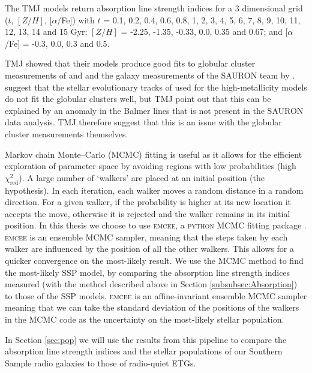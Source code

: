 			The TMJ models return absorption line strength indices for a 3 dimensional grid ($t$, $[Z/H]$, [$\alpha$/Fe]) with $t$ = 0.1, 0.2, 0.4, 0.6, 0.8, 1, 2, 3, 4, 5, 6, 7, 8, 9, 10, 11, 12, 13, 14 and 15 Gyr; $[Z/H]$ = -2.25, -1.35, -0.33, 0.0, 0.35 and 0.67; and [$\alpha$/Fe] = -0.3, 0.0, 0.3 and 0.5.

			TMJ showed that their models produce good fits to globular cluster measurements of \citet{Puzia2002} and \citet{Schiavon2005} and the galaxy measurements of the SAURON team by \citet{Kuntschner2010}. \citet{Conroy2010} suggest that the stellar evolutionary tracks of \citet{Girardi2000} used for the high-metallicity models do not fit the globular clusters well, but TMJ point out that this can be explained by an anomaly in the Balmer lines that is not present in the SAURON data analysis. TMJ therefore suggest that this is an issue with the globular cluster measurements themselves. 


			Markov chain Monte--Carlo (MCMC) fitting is useful as it allows for the efficient exploration of parameter space by avoiding regions with low probabilities (high $\chi^2_\text{red}$). A large number of `walkers' are placed at an initial position (the hypothesis). In each iteration, each walker moves a random distance in a random direction. For a given walker, if the probability is higher at its new location it accepts the move, otherwise it is rejected and the walker remains in its initial position. In this thesis we choose to use \textsc{emcee}, a \textsc{python} MCMC fitting package \citep{Foreman-Mackey2013}. \textsc{emcee} is an ensemble MCMC sampler, meaning that the steps taken by each walker are influenced by the position of all the other walkers. This allows for a quicker convergence on the most-likely result. We use the MCMC method to find the most-likely SSP model, by comparing the absorption line strength indices measured (with the method described above in Section \ref{subsubsec:Absorption}) to those of the SSP models. \textsc{emcee} is an affine-invariant ensemble MCMC sampler meaning that we can take the standard deviation of the positions of the walkers in the MCMC code as the uncertainty on the most-likely stellar population.

			In Section \ref{sec:pop} we will use the results from this pipeline to compare the absorption line strength indices and the stellar populations of our Southern Sample radio galaxies to those of radio-quiet ETGs.
